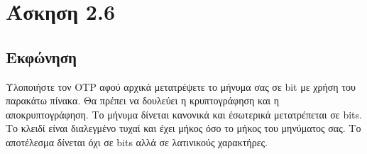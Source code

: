 \section{Άσκηση 2.6}

\subsection{Εκφώνηση}

Υλοποιήστε τον OTP αφού αρχικά μετατρέψετε το μήνυμα σας σε bit με χρήση του παρακάτω πίνακα. Θα πρέπει να δουλεύει η κρυπτογράφηση και η αποκρυπτογράφηση. Το μήνυμα δίνεται κανονικά και έσωτερικά μετατρέπεται σε bits. Το κλειδί είναι διαλεγμένο τυχαί και έχει μήκος όσο το μήκος του μηνύματος σας. Το αποτέλεσμα δίνεται όχι σε bits αλλά σε λατινικούς χαρακτήρες.